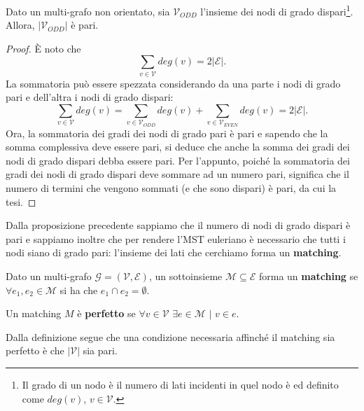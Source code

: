\begin{proposizione}
Dato un multi-grafo non orientato, sia $\mathcal{V}_{ODD}$ l'insieme dei nodi di grado dispari\footnote{Il grado di un nodo è il numero di lati incidenti in quel nodo è ed definito come $deg(v)$, $v\in\mathcal{V}$.}. Allora, $|\mathcal{V}_{ODD}|$ è pari.
\end{proposizione}
\begin{proof}
È noto che
\[
\sum_{v\in\mathcal{V}} deg(v)=2|\mathcal{E}|.
\]
La sommatoria può essere spezzata considerando da una parte i nodi di grado pari e dell'altra i nodi di grado dispari:
\[
\sum_{v\in\mathcal{V}} deg(v) = \sum_{v\in\mathcal{V}_{ODD}} deg(v) + \sum_{v\in\mathcal{V}_{EVEN}} deg(v) = 2|\mathcal{E}|.
\]
Ora, la sommatoria dei gradi dei nodi di grado pari è pari e sapendo che la somma complessiva deve essere pari, si deduce che anche la somma dei gradi dei nodi di grado dispari debba essere pari. Per l'appunto, poiché la sommatoria dei gradi dei nodi di grado dispari deve sommare ad un numero pari, significa che il numero di termini che vengono sommati (e che sono dispari) è pari, da cui la tesi.
\end{proof}

Dalla proposizione precedente sappiamo che il numero di nodi di grado dispari è pari e sappiamo inoltre che per rendere l'MST euleriano è necessario che tutti i nodi siano di grado pari: l'insieme dei lati che cerchiamo forma un \textbf{matching}.

\begin{definizione}
Dato un multi-grafo $\mathcal{G}=(\mathcal{V}, \mathcal{E})$, un sottoinsieme $\mathcal{M} \subseteq \mathcal{E}$ forma un \textbf{matching} se $\forall e_1,e_2 \in \mathcal{M}$ si ha che $e_1 \cap e_2 = \emptyset$.
\end{definizione}

\begin{definizione}
Un matching $M$ è \textbf{perfetto} se $\forall v\in\mathcal{V}\,\, \exists e\in\mathcal{M}\,\, |\,\, v\in e$.
\end{definizione}

Dalla definizione segue che una condizione necessaria affinché il matching sia perfetto è che $|\mathcal{V}|$ sia pari.

